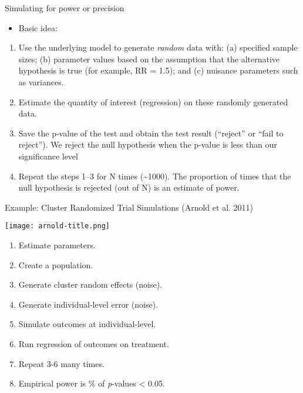 \documentclass[ignorenonframetext,]{beamer}
\providecommand{\tightlist}{%
  \setlength{\itemsep}{0pt}\setlength{\parskip}{0pt}}
\begin{document}
\begin{frame}{Simulating for power or precision}
\protect\hypertarget{simulating-for-power-or-precision}{}

\begin{itemize}
\tightlist
\item
  Basic idea:
\end{itemize}

\begin{enumerate}
\item
  Use the underlying model to generate \emph{random} data with: (a)
  specified sample sizes; (b) parameter values based on the assumption
  that the alternative hypothesis is true (for example, RR = 1.5); and
  (c) nuisance parameters such as variances.
\item
  Estimate the quantity of interest (regression) on these randomly
  generated data.
\item
  Save the p-value of the test and obtain the test result (``reject'' or
  ``fail to reject''). We reject the null hypothesis when the p-value is
  less than our significance level
\item
  Repeat the steps 1--3 for N times (\textasciitilde{}1000). The
  proportion of times that the null hypothesis is rejected (out of N) is
  an estimate of power.
\end{enumerate}

\end{frame}

\begin{frame}{Example: Cluster Randomized Trial Simulations (Arnold et
al. 2011)}
\protect\hypertarget{example-cluster-randomized-trial-simulations-arnold2011qf}{}

\texttt{[image: arnold-title.png]}

\begin{enumerate}
\tightlist
\item
  Estimate parameters.\\
\item
  Create a population.\\
\item
  Generate cluster random effects (noise).\\
\item
  Generate individual-level error (noise).\\
\item
  Simulate outcomes at individual-level.\\
\item
  Run regression of outcomes on treatment.\\
\item
  Repeat 3-6 many times.\\
\item
  Empirical power is \% of \emph{p}-values \textless{} 0.05.
\end{enumerate}

\end{frame}
\end{document}
